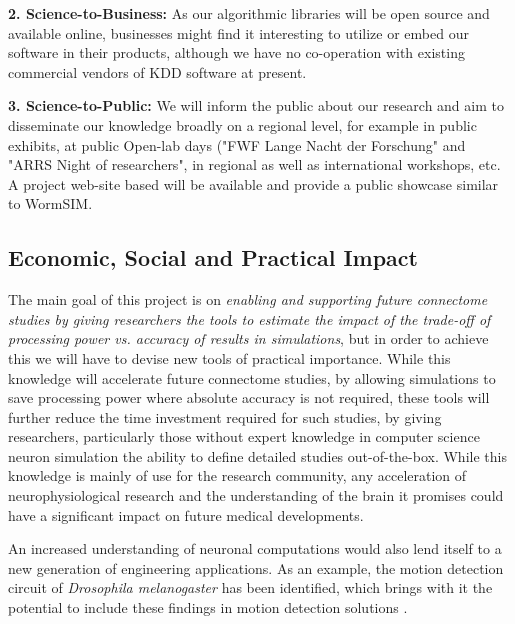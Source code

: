 \documentclass[a4paper,11pt]{article}
\begin{document}
\textbf{2. Science-to-Business:} As our algorithmic libraries will be open source and available online, businesses might find it interesting to utilize or embed our software in their products, although we have no co-operation with existing commercial vendors of KDD software at present.

\textbf{3. Science-to-Public:} We will inform the public about our research and aim to disseminate our knowledge broadly on a regional level, for example in public exhibits, at public Open-lab days ("FWF Lange Nacht der Forschung" and "ARRS Night of researchers", in regional as well as international workshops, etc. A project web-site based will be available and provide a public showcase similar to WormSIM.

\subsection{Economic, Social and Practical Impact}

The main goal of this project is on \emph{enabling and supporting future connectome studies by giving researchers the tools to estimate the impact of the trade-off of processing power vs. accuracy of results in simulations}, but in order to achieve this we will have to devise new tools of practical importance. While this knowledge will accelerate future connectome studies, by allowing simulations to save processing power where absolute accuracy is not required, these tools will further reduce the time investment required for such studies, by giving researchers, particularly those without expert knowledge in computer science neuron simulation the ability to define detailed studies out-of-the-box. While this knowledge is mainly of use for the research community, any acceleration of neurophysiological research and the understanding of the brain it promises could have a significant impact on future medical developments.

An increased understanding of neuronal computations would also lend itself to a new generation of engineering applications. As an example, the motion detection circuit of \emph{Drosophila melanogaster} has been identified, which brings with it the potential to include these findings in motion detection solutions \citep{Takemura2013}.
\end{document}
